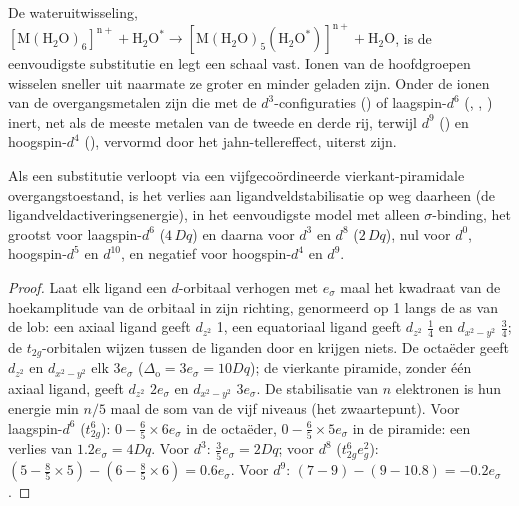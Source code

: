 De wateruitwisseling, $\mathrm{[M(H_2O)_6]^{n+} + H_2O^{\ast} \to [M(H_2O)_5(H_2O^{\ast})]^{n+} + H_2O}$, is de eenvoudigste
substitutie en legt een schaal vast. Ionen van de hoofdgroepen wisselen
sneller uit naarmate ze groter en minder geladen zijn. Onder de ionen van
de overgangsmetalen zijn die met de $d^3$-configuraties
() of laagspin-$d^6$ (, , ) inert, net als de meeste
metalen van de tweede en derde rij, terwijl $d^9$ () en hoogspin-$d^4$ (),
vervormd door het jahn-tellereffect, uiterst  zijn.

\begin{proposition}[Ligandveldactiveringsenergie]\label{prop:b3:complex-mechanisms:lfae}
Als een substitutie verloopt via een vijfgecoördineerde
vierkant-piramidale overgangstoestand, is het verlies aan
ligandveldstabilisatie op weg daarheen (de
ligandveldactiveringsenergie), in het eenvoudigste model met alleen $\sigma$-binding, het grootst voor laagspin-$d^6$
($4\,Dq$) en daarna voor $d^3$ en $d^8$ ($2\,Dq$), nul voor $d^0$, hoogspin-$d^5$ en $d^{10}$, en negatief
voor hoogspin-$d^4$ en $d^9$.
\end{proposition}

\begin{proof}
Laat elk ligand een $d$-orbitaal verhogen met $e_\sigma$ maal het kwadraat van de
hoekamplitude van de orbitaal in zijn richting, genormeerd op 1 langs de
as van de lob: een axiaal
ligand geeft $d_{z^2}$ 1, een equatoriaal ligand geeft $d_{z^2}$ $\frac14$ en $d_{x^2-y^2}$ $\frac34$; de $t_{2g}$-orbitalen wijzen
tussen de liganden door en krijgen niets. De octaëder geeft $d_{z^2}$ en $d_{x^2-y^2}$ elk $3e_\sigma$
($\Delta_{\mathrm o} = 3e_\sigma = 10Dq$); de vierkante piramide, zonder één axiaal ligand, geeft $d_{z^2}$ $2e_\sigma$ en
$d_{x^2-y^2}$ $3e_\sigma$. De stabilisatie van $n$ elektronen is hun energie min $n/5$ maal de som van
de vijf niveaus (het zwaartepunt). Voor laagspin-$d^6$ ($t_{2g}^6$): $0 - \frac65 \times 6e_\sigma$ in de
octaëder, $0 - \frac65 \times 5e_\sigma$ in de piramide: een verlies van $1.2e_\sigma = 4Dq$. Voor $d^3$: $\frac35e_\sigma =
2Dq$; voor $d^8$ ($t_{2g}^6e_g^2$): $(5 - \frac85 \times 5) - (6 - \frac85 \times 6) = 0.6e_\sigma$. Voor $d^9$: $(7 - 9) - (9 -
10.8) = -0.2e_\sigma$.
\end{proof}

